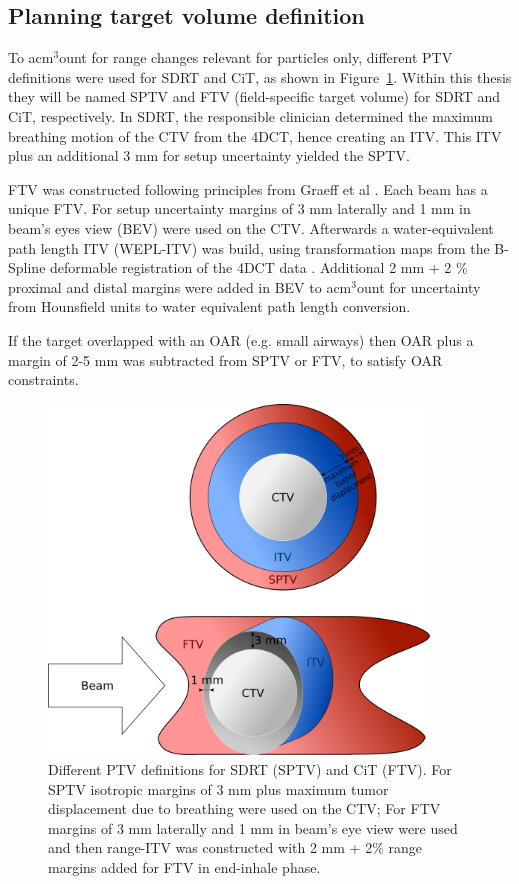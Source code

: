 \documentclass[type=dr, dr=rernat, acm$^3$entcolor=tud7b,colorbacktitle, bigchapter, openright, twoside, 12pt ]{tudthesis}
\begin{document}
\subsection{Planning target volume definition}

To acm$^3$ount for range changes relevant for particles only, different PTV definitions were used for SDRT and CiT, as shown in Figure~\ref{Fig:PTV_def}. 
Within this thesis they will be named SPTV and FTV (field-specific target volume) for SDRT and CiT, respectively.
In SDRT, the responsible clinician determined the maximum breathing motion of the CTV from the 4DCT, hence creating an ITV. This ITV plus an additional 3 mm for setup uncertainty yielded the SPTV.

FTV was constructed following principles from Graeff et al \cite{Graeff2012}. Each beam has a unique FTV. For setup uncertainty margins of 3 mm laterally and 1 mm in beam's eyes view (BEV) were used on the CTV. 
Afterwards a water-equivalent path length ITV (WEPL-ITV) was build, using transformation maps from the B-Spline deformable registration of the 4DCT data \cite{Shackleford2010}. Additional 2 mm + 2 \% proximal and distal margins 
were added in BEV to acm$^3$ount for uncertainty from Hounsfield units to water equivalent path length conversion.

If the target overlapped with an OAR (e.g. small airways) then OAR plus a margin of 2-5 mm was subtracted from SPTV or FTV, to satisfy OAR constraints.

\begin{figure}[H]
\begin{center}
\includegraphics[width=0.9\textwidth]{./Images/PTV_definition.png}
\caption{Different PTV definitions for SDRT (SPTV) and CiT (FTV). For SPTV isotropic margins of 3 mm plus maximum tumor displacement due to 
breathing were used on the CTV; For FTV margins of 3 mm laterally and 1 mm in beam’s eye view were used and then range-ITV was constructed with
2 mm + 2\% range margins added for FTV in end-inhale phase.}
\label{Fig:PTV_def}
\end{center}
\end{figure}
\end{document}
